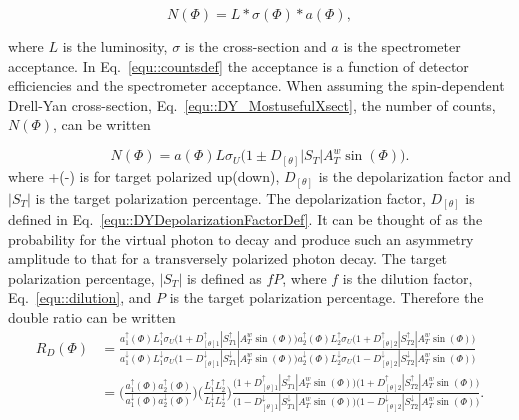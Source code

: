 \begin{equation}
  \label{equ::countsdef}
  N(\Phi) = L * \sigma(\Phi) * a(\Phi),
\end{equation}

\noindent
where $L$ is the luminosity, $\sigma$ is the cross-section and $a$ is the
spectrometer acceptance.  In Eq.~\ref{equ::countsdef} the acceptance is a
function of detector efficiencies and the spectrometer acceptance.  When
assuming the spin-dependent Drell-Yan cross-section,
Eq.~\ref{equ::DY_MostusefulXsect}, the number of counts, $N(\Phi)$, can be
written

\begin{equation}
  \label{equ::spindependentCounts}
  N(\Phi) = a(\Phi)L\sigma_U\Big(1 \pm D_{[\theta]}|S_T|A^w_T\sin(\Phi)\Big).
\end{equation}
\noindent
where +(-) is for target polarized up(down), $D_{[\theta]}$ is the
depolarization factor and $|S_T|$ is the target polarization percentage.  The
depolarization factor, $D_{[\theta]}$ is defined in
Eq.~\ref{equ::DYDepolarizationFactorDef}.  It can be thought of as the
probability for the virtual photon to decay and produce such an asymmetry
amplitude to that for a transversely polarized photon decay.  The target
polarization percentage, $|S_T|$ is defined as $fP$, where $f$ is the dilution
factor, Eq.~\ref{equ::dilution}, and $P$ is the target polarization
percentage.  Therefore the double ratio can be written
\begin{align}
  R_D(\Phi) &= \frac{ a_1^{\uparrow}(\Phi)L_1^{\uparrow}\sigma_U\Big(1 +
    D_{[\theta]1}^{\uparrow}|S_{T1}^{\uparrow}|A^w_T\sin(\Phi)\Big)
    a_2^{\uparrow}(\Phi)L_2^{\uparrow}\sigma_U\Big(1 +
    D_{[\theta]2}^{\uparrow}|S_{T2}^{\uparrow}|A^w_T\sin(\Phi)\Big) } {
    a_1^{\downarrow}(\Phi)L_1^{\downarrow}\sigma_U\Big(1 -
    D_{[\theta]1}^{\downarrow}|S_{T1}^{\downarrow}|A^w_T\sin(\Phi)\Big)
    a_2^{\downarrow}(\Phi)L_2^{\downarrow}\sigma_U\Big(1 -
    D_{[\theta]2}^{\downarrow}|S_{T2}^{\downarrow}|A^w_T\sin(\Phi)\Big) }
  \\ \nonumber &= \Big(\frac{a_1^{\uparrow}(\Phi)a_2^{\uparrow}(\Phi)}
     {a_1^{\downarrow}(\Phi)a_2^{\downarrow}(\Phi)} \Big)
     \Big(\frac{L_1^{\uparrow}L_2^{\uparrow}}
         {L_1^{\downarrow}L_2^{\downarrow}}\Big)
         \frac{\Big(1+D_{[\theta]1}^{\uparrow}|S_{T1}^{\uparrow}|A^w_T\sin(\Phi)\Big)
           \Big(1+D_{[\theta]2}^{\uparrow}|S_{T2}^{\uparrow}|A^w_T\sin(\Phi)\Big)}
              {\Big(1-D_{[\theta]1}^{\downarrow}|S_{T1}^{\downarrow}|A^w_T\sin(\Phi)\Big)
                \Big(1-D_{[\theta]2}^{\downarrow}|S_{T2}^{\downarrow}|A^w_T\sin(\Phi)\Big)
              }.
\end{align}
